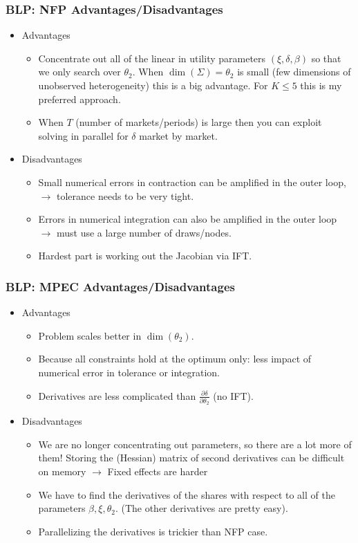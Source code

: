 \documentclass[aspectratio=169,10pt]{beamer}
\begin{document}
\begin{frame}
\frametitle{BLP: NFP Advantages/Disadvantages}
\begin{itemize}
\item Advantages
\begin{itemize}
\item Concentrate out all of the linear in utility parameters $(\xi,\delta,\beta)$ so that we only search over $\theta_2$. When $\dim(\Sigma)=\theta_2$ is small (few dimensions of unobserved heterogeneity) this is a big advantage. For $K \leq 5$ this is my preferred approach.
\item When $T$ (number of markets/periods) is large then you can exploit solving in parallel for $\delta$ market by market.
\end{itemize}
\item Disadvantages
\begin{itemize}
\item Small numerical errors in contraction can be amplified in the outer loop, $\rightarrow$ tolerance needs to be very tight.
\item Errors in numerical integration can also be amplified in the outer loop $\rightarrow$ must use a large number of draws/nodes.
\item Hardest part is working out the Jacobian via IFT.
\end{itemize}
\end{itemize}
\end{frame}

\begin{frame}
\frametitle{BLP: MPEC Advantages/Disadvantages}
\begin{itemize}
\item Advantages
\begin{itemize}
\item Problem scales better in $\dim(\theta_2)$.
\item Because all constraints hold at the optimum only: less impact of numerical error in tolerance or integration.
\item Derivatives are less complicated than $\frac{\partial \delta}{\partial \theta_2}$ (no IFT).
\end{itemize}
\item Disadvantages
\begin{itemize}
\item We are no longer concentrating out parameters, so there are a lot more of them! Storing the (Hessian) matrix of second derivatives can be difficult on memory $\rightarrow$ Fixed effects are harder
\item We have to find the derivatives of the shares with respect to all of the parameters $\beta,\xi,\theta_2$. (The other derivatives are pretty easy).
\item Parallelizing the derivatives is trickier than NFP case.
\end{itemize}
\end{itemize}
\end{frame}
\end{document}
